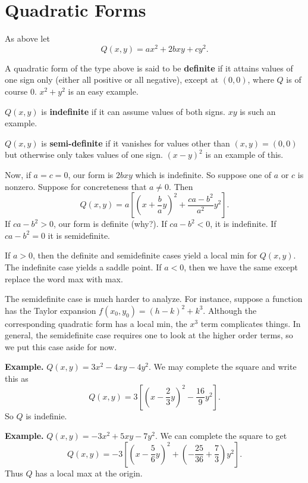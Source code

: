 \documentclass{article}
\begin{document}
\section*{Quadratic Forms}

As above let 
\[Q(x,y) = ax^2 + 2bxy + cy^2.\]

A quadratic form of the type above is said to be \textbf{definite} if 
it attains values of one sign only (either all positive or all negative), 
except at $(0,0)$, where $Q$ is of course $0$. $x^2 + y^2$ is an easy example.

$Q(x,y)$ is \textbf{indefinite} if it can assume values of both signs. 
$xy$ is such an example.

$Q(x,y)$ is \textbf{semi-definite} if it vanishes for values other 
than $(x,y)=(0,0)$ but otherwise only takes values of one sign. 
$(x-y)^2$ is an example of this.

Now, if $a=c=0$, our form is $2bxy$ which is indefinite. 
So suppose one of $a$ or $c$ is nonzero. Suppose for concreteness
that $a \neq 0$. Then 
\[Q(x,y) = a \left[ {\left( x + \frac{b}{a}y \right)}^2 +\frac{ca-b^2}{a^2}y^2\right].\]
If $ca-b^2>0$, our form is definite (why?). If $ca-b^2 < 0$, it is indefinite.
If $ca-b^2=0$ it is semidefinite.

If $a>0$, then the definite and semidefinite cases yield a local min
for $Q(x,y)$. The indefinite case yields a saddle point. If $a<0$, then
we have the same except replace the word max with max.

The semidefinite case is much harder to analyze. For instance, suppose a function
has the Taylor expansion $f(x_0,y_0)= (h-k)^2 + k^3$. Although the corresponding
quadratic form has a local min, the $x^3$ term complicates things. In general,
the semidefinite case requires one to look at the higher order terms, so we put this case aside
for now.

\textbf{Example.} $Q(x,y) = 3x^2 - 4xy - 4y^2$. 
We may complete the square and write this as 
\[Q(x,y) = 3 \left[ \left( x - \frac{2}{3}y \right)^2 - \frac{16}{9}y^2 \right].\]
So $Q$ is indefinie.

\textbf{Example.} $Q(x,y) = -3x^2 + 5xy - 7y^2$. We can complete the square
to get 
\[Q(x,y) = -3 \left[ \left( x - \frac{5}{6}y \right)^2 + \left( -\frac{25}{36} + \frac{7}{3} \right)y^2  \right].\]
Thus $Q$ has a local max at the origin.
\end{document}
